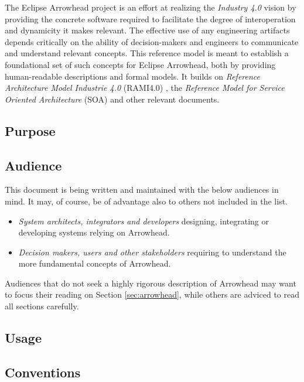 The Eclipse Arrowhead project is an effort at realizing the \textit{Industry 4.0} vision by providing the concrete software required to facilitate the degree of interoperation and dynamicity it makes relevant.
The effective use of any engineering artifacts depends critically on the ability of decision-makers and engineers to communicate and understand relevant concepts.
This reference model is meant to establish a foundational set of such concepts for Eclipse Arrowhead, both by providing human-readable descriptions and formal models.
It builds on \textit{Reference Architecture Model Industrie 4.0} (RAMI4.0) \cite{adolphs2016reference}, the \textit{Reference Model for Service Oriented Architecture} (SOA) \cite{mackenzie2006reference} and other relevant documents.

\subsection{Purpose}
\label{sec:introduction:purpose}


\subsection{Audience}
\label{sec:introduction:audience}

This document is being written and maintained with the below audiences in mind.
It may, of course, be of advantage also to others not included in the list.

\begin{itemize}
\item \textit{System architects, integrators and developers} designing, integrating or developing systems relying on Arrowhead.
\item \textit{Decision makers, users and other stakeholders} requiring to understand the more fundamental concepts of Arrowhead.
\end{itemize}

Audiences that do not seek a highly rigorous description of Arrowhead may want to focus their reading on Section \ref{sec:arrowhead}, while others are adviced to read all sections carefully.

\subsection{Usage}
\label{sec:introduction:usage}

\subsection{Conventions}
\label{sec:introduction:conventions}

